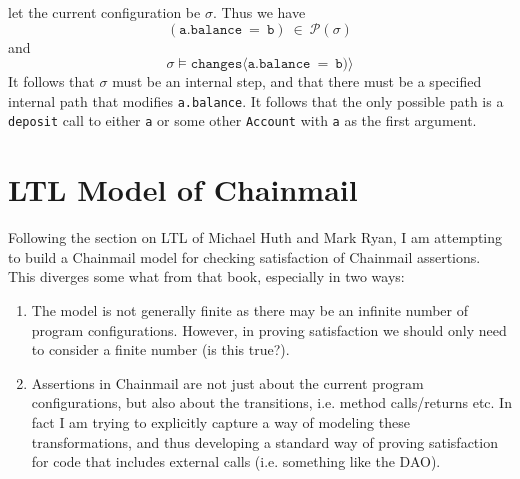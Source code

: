 \documentclass[12pt]{article}
\begin{document}
	\noindent
	let the current configuration be $\sigma$. Thus we have
	$$(\texttt{a.balance}\ = \ \texttt{b})\ \in\ \mathcal{P}(\sigma)$$ and 
	$$\sigma \vDash \texttt{changes}\langle\texttt{a.balance}\ = \ \texttt{b})\rangle$$
	It follows that $\sigma$ must be an internal step, and that there must be a specified 
	internal path that modifies \texttt{a.balance}.
	It follows that the only possible path is a \texttt{deposit} call to either \texttt{a}
	or some other \texttt{Account} with \texttt{a} as the first argument.  
	
	
	
	
	\newpage

	
	\section{LTL Model of Chainmail}
	
	Following the section on LTL of Michael Huth and Mark Ryan, I am attempting to build
	a Chainmail model for checking satisfaction of Chainmail assertions. This diverges some what 
	from that book, especially in two ways:
	\begin{enumerate}
	\item
		The model is not generally finite as there may be an infinite number of program configurations. However, in proving satisfaction 
		we should only need to consider a finite number (is this true?).
	\item
		Assertions in Chainmail are not just about the current program configurations, but also about the transitions, i.e. method calls/returns etc.
		In fact I am trying to explicitly capture a way of modeling these transformations, and thus developing a standard way of proving satisfaction
		for code that includes external calls (i.e. something like the DAO).
	\end{enumerate}
	
\end{document}
